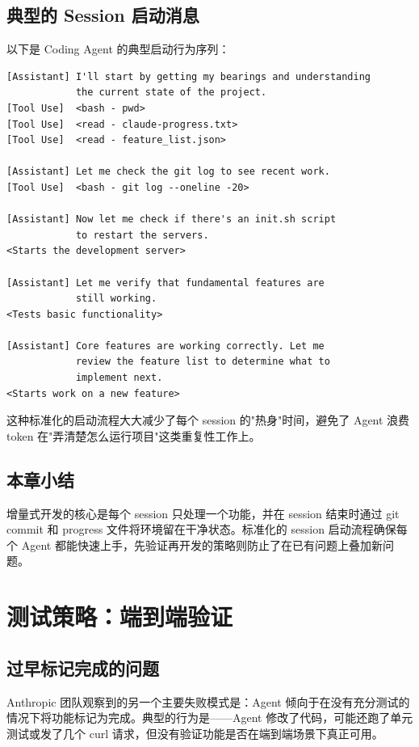 \documentclass[a4paper]{article}
\begin{document}
\subsection{典型的 Session 启动消息}

以下是 Coding Agent 的典型启动行为序列：

\begin{lstlisting}[language={}, caption={Coding Agent 典型的 session 启动流程}]
[Assistant] I'll start by getting my bearings and understanding
            the current state of the project.
[Tool Use]  <bash - pwd>
[Tool Use]  <read - claude-progress.txt>
[Tool Use]  <read - feature_list.json>

[Assistant] Let me check the git log to see recent work.
[Tool Use]  <bash - git log --oneline -20>

[Assistant] Now let me check if there's an init.sh script
            to restart the servers.
<Starts the development server>

[Assistant] Let me verify that fundamental features are
            still working.
<Tests basic functionality>

[Assistant] Core features are working correctly. Let me
            review the feature list to determine what to
            implement next.
<Starts work on a new feature>
\end{lstlisting}

这种标准化的启动流程大大减少了每个 session 的"热身"时间，避免了 Agent 浪费 token 在"弄清楚怎么运行项目"这类重复性工作上。

\subsection{本章小结}

增量式开发的核心是每个 session 只处理一个功能，并在 session 结束时通过 git commit 和 progress 文件将环境留在干净状态。标准化的 session 启动流程确保每个 Agent 都能快速上手，先验证再开发的策略则防止了在已有问题上叠加新问题。


\section{测试策略：端到端验证}

\subsection{过早标记完成的问题}

Anthropic 团队观察到的另一个主要失败模式是：Agent 倾向于在没有充分测试的情况下将功能标记为完成。典型的行为是——Agent 修改了代码，可能还跑了单元测试或发了几个 curl 请求，但没有验证功能是否在端到端场景下真正可用。
\end{document}
